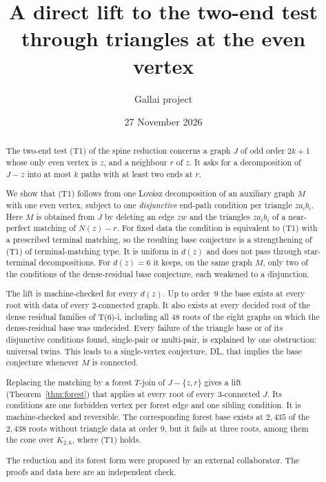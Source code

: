 \documentclass[11pt]{amsart}
\title{A direct lift to the two-end test through triangles at the even vertex}
\author{Gallai project}
\date{27 November 2026}
\theoremstyle{definition}
\begin{document}
\begin{abstract}
The two-end test (T1) of the spine reduction concerns a graph $J$ of odd order $2k+1$ whose only even
vertex is $z$, and a neighbour $r$ of $z$. It asks for a decomposition of $J-z$ into at most $k$ paths
with at least two ends at $r$.

We show that (T1) follows from one Lov\'asz decomposition of an auxiliary graph $M$ with one even
vertex, subject to one \emph{disjunctive} end-path condition per triangle $za_ib_i$. Here $M$ is
obtained from $J$ by deleting an edge $zw$ and the triangles $za_ib_i$ of a near-perfect matching of
$N(z)-r$. For fixed data the condition is equivalent to (T1) with a prescribed terminal matching, so
the resulting base conjecture is a strengthening of (T1) of terminal-matching type. It is uniform in
$d(z)$ and does not pass through star-terminal decompositions. For $d(z)=6$ it keeps, on the same
graph $M$, only two of the conditions of the dense-residual base conjecture, each weakened to a
disjunction.

The lift is machine-checked for every $d(z)$. Up to order~$9$ the base exists at every root with
data of every $2$-connected graph. It also exists at every decided root of the dense residual
families of T(6)-i, including all $48$ roots of the eight graphs on which the dense-residual base was
undecided. Every failure of the triangle base or of its disjunctive conditions found, single-pair or
multi-pair, is explained by one obstruction: universal twins. This leads to a single-vertex conjecture, DL, that implies the
base conjecture whenever $M$ is connected.

Replacing the matching by a forest $T$-join of $J-\{z,r\}$ gives a lift (Theorem~\ref{thm:forest})
that applies at every root of every $3$-connected $J$. Its conditions are one forbidden vertex per
forest edge and one sibling condition. It is machine-checked and reversible. The corresponding
forest base exists at $2{,}435$ of the $2{,}438$ roots without triangle data at order $9$, but it fails
at three roots, among them the cone over $K_{2,6}$, where (T1) holds.

The reduction and its forest form were proposed by an external collaborator. The proofs and data
here are an independent check.
\end{abstract}

\maketitle
\end{document}

